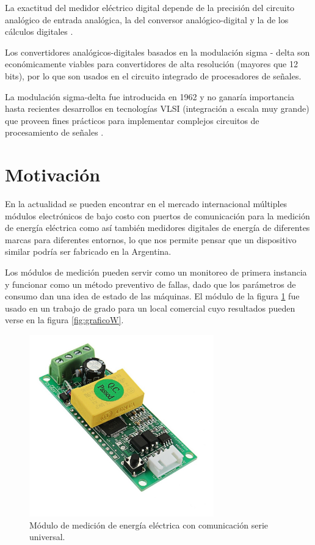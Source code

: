 La exactitud del medidor eléctrico digital depende de la precisión del circuito analógico de entrada analógica, la del conversor analógico-digital y la de los cálculos digitales \citep{Hribik2004DigitalPA}.

Los convertidores analógicos-digitales basados en la modulación sigma - delta son económicamente viables para convertidores de alta resolución (mayores que 12 bits), por lo que son  usados en el circuito integrado de procesadores de señales.

La modulación sigma-delta fue introducida en 1962 y no ganaría importancia hasta recientes desarrollos en tecnologías VLSI (integración a escala muy grande) que proveen fines prácticos para implementar complejos circuitos de procesamiento de señales \citep{book:28601}.

\section{Motivación}

En la actualidad se pueden encontrar en el mercado internacional múltiples módulos electrónicos de bajo costo con puertos de comunicación para la medición de energía eléctrica como así también medidores digitales de energía de diferentes marcas para diferentes entornos, lo que nos permite pensar que un dispositivo similar podría ser fabricado en la Argentina.

Los módulos de medición pueden servir como un monitoreo de primera instancia y funcionar como un método preventivo de fallas, dado que los parámetros de consumo dan una idea de estado de las máquinas.  El módulo de la figura \ref{fig:pzem04} fue usado en un trabajo de grado para un local comercial cuyo resultados pueden verse en la figura \ref{fig:graficoW}.  

\begin{figure}[h]
	\centering
	\includegraphics[width=80mm,keepaspectratio]{Figures/pzeem004.jpg}
	\caption{Módulo de medición de energía eléctrica con comunicación serie universal.}
	\label{fig:pzem04}
\end{figure}


